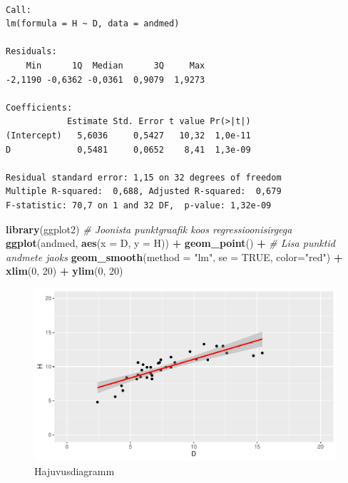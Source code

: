 \documentclass[
]{book}
\newenvironment{Shaded}{\begin{snugshade}}{\end{snugshade}}
\newcommand{\AttributeTok}[1]{\textcolor[rgb]{0.13,0.29,0.53}{#1}}
\newcommand{\CommentTok}[1]{\textcolor[rgb]{0.56,0.35,0.01}{\textit{#1}}}
\newcommand{\ConstantTok}[1]{\textcolor[rgb]{0.56,0.35,0.01}{#1}}
\newcommand{\DecValTok}[1]{\textcolor[rgb]{0.00,0.00,0.81}{#1}}
\newcommand{\FunctionTok}[1]{\textcolor[rgb]{0.13,0.29,0.53}{\textbf{#1}}}
\newcommand{\NormalTok}[1]{#1}
\newcommand{\SpecialCharTok}[1]{\textcolor[rgb]{0.81,0.36,0.00}{\textbf{#1}}}
\newcommand{\StringTok}[1]{\textcolor[rgb]{0.31,0.60,0.02}{#1}}
\renewenvironment{Shaded} {\begin{snugshade}\footnotesize} {\end{snugshade}}
\begin{document}
\begin{verbatim}

Call:
lm(formula = H ~ D, data = andmed)

Residuals:
    Min      1Q  Median      3Q     Max 
-2,1190 -0,6362 -0,0361  0,9079  1,9273 

Coefficients:
            Estimate Std. Error t value Pr(>|t|)
(Intercept)   5,6036     0,5427   10,32  1,0e-11
D             0,5481     0,0652    8,41  1,3e-09

Residual standard error: 1,15 on 32 degrees of freedom
Multiple R-squared:  0,688, Adjusted R-squared:  0,679 
F-statistic: 70,7 on 1 and 32 DF,  p-value: 1,32e-09
\end{verbatim}

\begin{Shaded}
\begin{Highlighting}[]
\FunctionTok{library}\NormalTok{(ggplot2)}
\CommentTok{\# Joonista punktgraafik koos regressioonisirgega}
\FunctionTok{ggplot}\NormalTok{(andmed, }\FunctionTok{aes}\NormalTok{(}\AttributeTok{x =}\NormalTok{ D, }\AttributeTok{y =}\NormalTok{ H)) }\SpecialCharTok{+}
  \FunctionTok{geom\_point}\NormalTok{() }\SpecialCharTok{+} \CommentTok{\# Lisa punktid andmete jaoks}
  \FunctionTok{geom\_smooth}\NormalTok{(}\AttributeTok{method =} \StringTok{"lm"}\NormalTok{, }\AttributeTok{se =} \ConstantTok{TRUE}\NormalTok{, }\AttributeTok{color=}\StringTok{"red"}\NormalTok{) }\SpecialCharTok{+}
    \FunctionTok{xlim}\NormalTok{(}\DecValTok{0}\NormalTok{, }\DecValTok{20}\NormalTok{) }\SpecialCharTok{+} \FunctionTok{ylim}\NormalTok{(}\DecValTok{0}\NormalTok{, }\DecValTok{20}\NormalTok{)}
\end{Highlighting}
\end{Shaded}

\begin{figure}[H]
\includegraphics[width=0.8\linewidth]{_main_files/figure-latex/unnamed-chunk-47-1} \caption{Hajuvusdiagramm}\label{fig:unnamed-chunk-47}
\end{figure}
\end{document}
